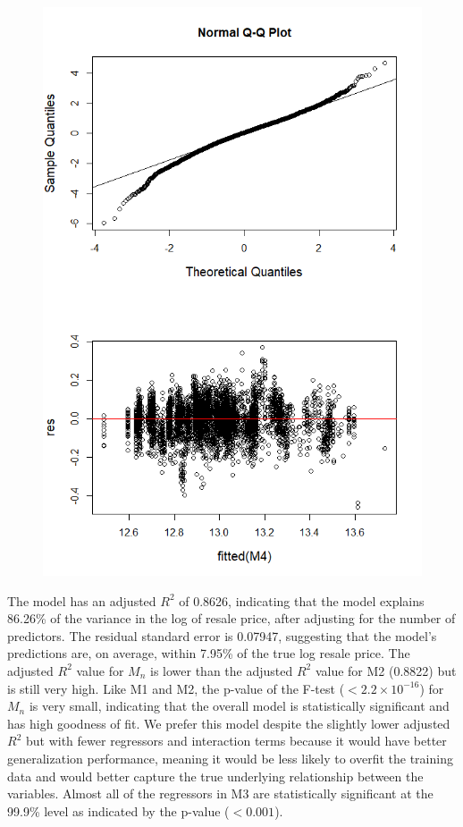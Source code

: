 \begin{figure}[!htp]
\begin{minipage}[t]{0.35\textwidth}
\includegraphics[width=\textwidth]{images2/mnupdated.png}
  \label{fig: mn assumption check}
\end{minipage}
\end{figure}
\newline
The model has an adjusted $R^2$ of 0.8626, indicating that the model explains 86.26\% of the variance in the log of resale price, after adjusting for the number of predictors. The residual standard error is 0.07947, suggesting that the model's predictions are, on average, within 7.95\% of the true log resale price. The adjusted $R^2$ value for $M_n$ is lower than the adjusted $R^2$ value for M2 (0.8822) but is still very high. Like M1 and M2, the p-value of the F-test ($ < 2.2 \times 10^{-16}$) for $M_n$ is very small, indicating that the overall model is statistically significant and has high goodness of fit. We prefer this model despite the slightly lower adjusted $R^2$ but with fewer regressors and interaction terms because it would have better generalization performance, meaning it would be less likely to overfit the training data and would better capture the true underlying relationship between the variables. Almost all of the regressors in M3 are statistically significant at the 99.9\% level as indicated by the p-value ($< 0.001$).

